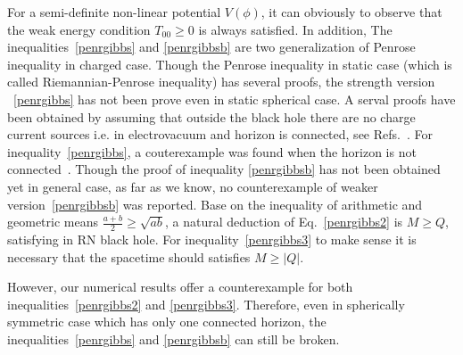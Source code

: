 \documentclass[pr, twocolumn, preprintnumbers, showpacs,footnoteadded, superscriptaddress,nofootinbib,longbibliography]{revtex4-1}
\begin{document}
For a semi-definite non-linear potential $V(\phi)$, it can obviously to observe that the weak energy condition $T_{00} \geq 0$ is always satisfied. In addition, The inequalities~\eqref{penrgibbs} and \eqref{penrgibbsb} are two generalization of Penrose inequality in charged case. Though the Penrose inequality in static case (which is called Riemannian-Penrose inequality) has several proofs, the strength version ~\eqref{penrgibbs} has not been prove even in static spherical case. A serval proofs have been obtained by assuming that outside the black hole there are no charge current sources i.e. in electrovacuum and horizon is connected, see Refs.~\cite{Malec:1994sy,Hayward:1998jj,Gibbons:1998zr,Khuri2013}. For inequality~\eqref{penrgibbs}, a couterexample was found when the horizon is not connected~\cite{Weinstein2005}. Though the proof of inequality \eqref{penrgibbsb} has not been obtained yet in general case, as far as we know, no counterexample of weaker version~\eqref{penrgibbsb} was reported. Base on the inequality of arithmetic and geometric means $\frac{a+b}{2}\geq \sqrt{ab}$, a natural deduction of Eq.~\eqref{penrgibbs2} is $M \geq Q$, satisfying in RN black hole. For  inequality~\eqref{penrgibbs3} to make sense it is necessary that the spacetime should satisfies $M\geq |Q|$.


However, our numerical results offer a counterexample for both inequalities~\eqref{penrgibbs2} and \eqref{penrgibbs3}. Therefore, even in spherically symmetric case which has only one connected horizon, the inequalities~\eqref{penrgibbs} and \eqref{penrgibbsb} can still be broken.
\end{document}
